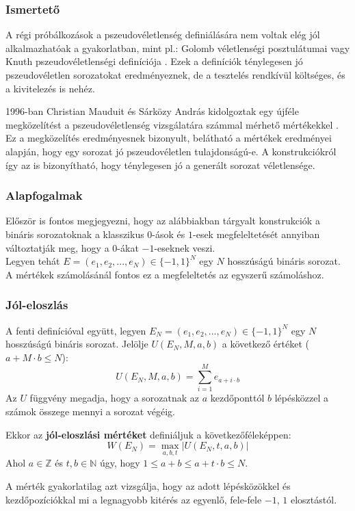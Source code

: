 \documentclass[12pt]{article}
\begin{document}
	\subsubsection*{Ismertető}
	A régi próbálkozások a pszeudovéletlenség definiálására nem voltak elég jól alkalmazhatóak a gyakorlatban, mint pl.: Golomb véletlenségi posztulátumai vagy Knuth pszeudovéletlenségi definíciója \cite{knuth}. Ezek a definíciók ténylegesen jó pszeudovéletlen sorozatokat eredményeznek, de a tesztelés rendkívül költséges, és a kivitelezés is nehéz.
	
	1996-ban Christian Mauduit és Sárközy András kidolgoztak egy újféle megközelítést a pszeudovéletlenség vizsgálatára számmal mérhető mértékekkel \cite{sarkozymauduit}. Ez a megközelítés eredményesnek bizonyult, belátható a mértékek eredményei alapján, hogy egy sorozat jó pszeudovéletlen tulajdonságú-e. A konstrukciókról így az is bizonyítható, hogy ténylegesen jó a generált sorozat véletlensége.
	\subsubsection*{Alapfogalmak}
	Először is fontos megjegyezni, hogy az alábbiakban tárgyalt konstrukciók a bináris sorozatoknak a klasszikus $0$-ások és $1$-esek megfeleltetését annyiban változtatják meg, hogy a $0$-ákat $-1$-eseknek veszi. \\
	Legyen tehát $E=(e_1, e_2, ..., e_N) \in \{-1, 1\}^N$ egy $N$ hosszúságú bináris sorozat. A mértékek számolásánál fontos ez a megfeleltetés az egyszerű számoláshoz.
	\subsubsection{Jól-eloszlás}
	A fenti definícióval együtt, legyen $E_N=(e_1, e_2, ..., e_N) \in \{-1, 1\}^N$ egy $N$ hosszúságú bináris sorozat. Jelölje $U(E_N, M, a, b)$ a következő értéket ($a+M\cdot b \leq N$):
	$$U(E_N, M, a, b) = \sum_{i=1}^{M}e_{a+i\cdot b}$$
	Az $U$ függvény megadja, hogy a sorozatnak az $a$ kezdőponttól $b$ lépésközzel a számok összege mennyi a sorozat végéig.
	
	Ekkor az \textbf{jól-eloszlási mértéket} definiáljuk a következőféleképpen:
	$$W(E_N) = \max_{a, b, t}{|U(E_N, t, a, b)|}$$
	Ahol $a \in \mathbb{Z}$ és $t, b \in \mathbb{N}$ úgy, hogy $1 \leq a+b \leq a+t\cdot b \leq N$.
	
	A mérték gyakorlatilag azt vizsgálja, hogy az adott lépésközökkel és kezdőpozíciókkal mi a legnagyobb kitérés az egyenlő, fele-fele $-1$, $1$ elosztástól.
	
\end{document}
